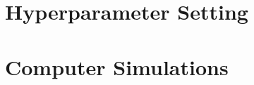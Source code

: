 \documentclass[12pt, draftclsnofoot, onecolumn]{IEEEtran}
\begin{document}
\section{Hyperparameter Setting}

\section{Computer Simulations}


%
%



%
%
\end{document}

